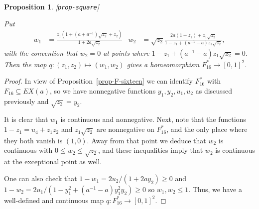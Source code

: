 \documentclass[reqno]{amsart}
\newcommand{\lbl}[1]{\label{#1}\textup{[\texttt{#1}]}\par}
\newcommand{\lbl}{\label}
\newcommand{\sse}       {\subseteq}
\renewcommand{\:}{\colon}
\newtheorem{proposition}[theorem]{Proposition}
\theoremstyle{definition}
\begin{document}
\begin{proposition}\lbl{prop-square}
 Put
 \begin{align*}
  w_1 &= \frac{z_1(1+(a+a^{-1})\sqrt{z_2}+z_2)}{1+2a\sqrt{z_2}} &
  w_2 &=
   \sqrt{z_2}\frac{2a(1-z_1)+z_1\sqrt{z_2}}{1-z_1+(a^{-1}-a)z_1\sqrt{z_2}},
 \end{align*}
 with the convention that $w_2=0$ at points where
 $1-z_1+(a^{-1}-a)z_1\sqrt{z_2}=0$.  Then the map
 $q\:(z_1,z_2)\mapsto(w_1,w_2)$ gives a homeomorphism $F_{16}^*\to[0,1]^2$.
\end{proposition}
\begin{proof}
 In view of Proposition~\ref{prop-F-sixteen} we can identify
 $F_{16}^*$ with $F_{16}\sse EX(a)$, so we have nonnegative functions
 $y_1,y_2,u_1,u_2$ as discussed previously and $\sqrt{z_2}=y_2$.

 It is clear that $w_1$ is continuous and nonnegative.  Next,
 note that the functions $1-z_1=u_4+z_1z_2$ and $z_1\sqrt{z_2}$ are
 nonnegative on $F_{16}^*$, and the only place where they both vanish
 is $(1,0)$.  Away from that point we deduce that $w_2$ is continuous
 with $0\leq w_2\leq\sqrt{z_2}$, and these inequalities imply that
 $w_2$ is continuous at the exceptional point as well.

 One can also check that $1-w_1=2u_2/(1+2ay_2)\geq 0$ and
 $1-w_2=2u_1/(1-y_1^2+(a^{-1}-a)y_1^2y_2)\geq 0$ so
 $w_1,w_2\leq 1$.  Thus, we have a well-defined and continuous map
 $q\:F_{16}^*\to [0,1]^2$.


\end{proof}
\end{document}
